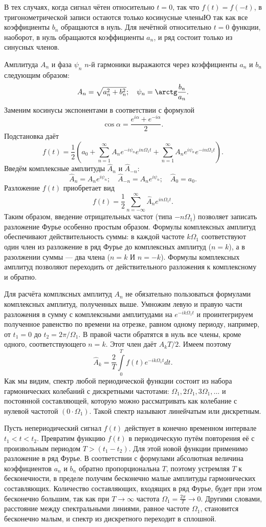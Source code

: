 \documentclass[a4paper, fontsize=14pt]{article}
\begin{document}
В тех случаях, когда сигнал чётен относительно $t = 0$, так что $f(t) = f(-t)$, в тригонометрической записи остаются только косинусные членыЮ так как все коэффициенты $b_n$ обращаются в нуль. Для нечётной относительно $t = 0$ функции, наоборот, в нуль обращаются коэффициенты $a_n$, и ряд состоит только из синусных членов.

Амплитуда $A_n$ и фаза $\psi_n$ $n$-й гармоники выражаются через коэффициенты $a_n$ и $b_n$ следующим образом:
\[
	A_n = \sqrt{a_n^2 + b_n^2}; \quad \psi_n = \arctg \frac{b_n}{a_n}.
\]
Заменим косинусы экспонентами в соответствии с формулой
\[
	\cos \alpha = \frac{e^{i \alpha} + e^{-i \alpha}}{2}.
\]
Подстановка даёт
\[
f(t)=\frac{1}{2}\left(a_{0}+\sum_{n=1}^{\infty} A_{n} e^{-i \psi_{n}} e^{i n \Omega_{1} t}+\sum_{n=1}^{\infty} A_{n} e^{i \psi_{n}} e^{-i n \Omega_{1} t}\right).
\]
Введём комплексные амплитуды $\hat A_n$ и $\hat A_{-n}$:
\[
	\hat A_n = A_n e^{i \psi_n}; \quad \hat A_{-n} = A_n e^{i \psi_n}; \quad \hat A_0 = a_0.
\]
Разложение $f(t)$ приобретает вид
\[
	f(t) = \frac{1}{2} \sum_{n = - \infty}^{\infty} \hat A_n e^{i n \Omega_1 t}.
\]
Таким образом, введение отрицательных частот (типа $-n\Omega_1$) позволяет записать разложение Фурье особенно простым образом. Формулы комплексных амплитуд обеспечивают действительность суммы: в каждой частоте $k \Omega_1$ соответствуют один член из разложение в ряд Фурье до комплексных амплитуд ($n = k$), а в разолжении суммы --- два члена ($n = k$ И $n = -k$). Формулы комплексных амплитуд позволяют переходить от действительного разложения к комплексному и обратно.

Для расчёта комплксных амплитуд $A_n$ не обязательно пользоваться формулами комплексных амплитуд, полученных выше. Умножим левую и правую части разложения в сумму с комплексными амплитудами на $e^{-i k \Omega_1 t}$ и проинтегрируем полученное равенство по времени на отрезке, равном одному периоду, например, от $t_1 = 0$ до $t_2 = 2 \pi / \Omega_1$. В правой части обратятся в нуль все члены, кроме одного, соответствующего $n = k$. Этот член даёт $A_k T /2$. Имеем поэтому
\[
	\hat A_k = \frac{2}{T} \int\limits_0^T f(t) e^{-i k \Omega_1 t} dt.
\]
Как мы видим, спектр любой периодической функции состоит из набора гармонических колебаний с дискретными частотами: $\Omega_1, 2\Omega_1, 3\Omega_1, \ldots$ и постоянной составляющей, которую можно рассматривать как колебание с нулевой частотой $(0 \cdot \Omega_1)$. Такой спектр называют линейчатым или дискретным.

Пусть непериодический сигнал $f(t)$ действует в конечно временном интервале $t_1 < t < t_2$. Превратим функцию $f(t)$ в периодическую путём повторения её с произвольным периодом $T > (t_1 - t_2)$. Для этой новой функции применимо разложение в ряд Фурье. В соответствии с формулами абсолютная величина коэффициентов $a_n$ и $b_n$ обратно пропорциональна $T$, поэтому устремляя $T$ к бесконечности, в пределе получим бесконечно малые амплитуды гармонических составляющих. Количество составляющих, входящих в ряд Фурье, будет при этом бесконечно большим, так как при $T \rightarrow \infty$ частота $\Omega_1 = \frac{2 \pi}{T} \rightarrow 0$. Другими словами, расстояние между спектральными линиями, равное частоте $\Omega_1$, становится бесконечно малым, и спектр из дискретного переходит в сплошной.
\end{document}
